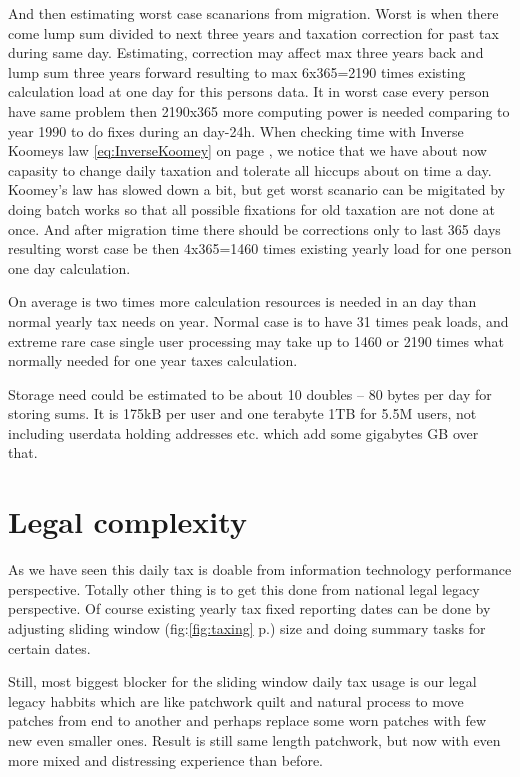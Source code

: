And then estimating worst case scanarions from migration. Worst is when there
come lump sum divided to next three years and taxation correction for past tax
during same day. Estimating, correction may affect max three years back and
lump sum three years forward resulting to max 6x365=2190 times existing
calculation load at one day for this persons data. It in worst case every
person have same problem then 2190x365 more computing power is needed
comparing to year 1990 to do fixes during an day-24h. When checking time with
Inverse Koomeys law \ref{eq:InverseKoomey} on page \pageref{eq:InverseKoomey},
we notice that we have about now capasity to change daily taxation and
tolerate all hiccups about on time a day. Koomey's law has slowed down a bit,
but get worst scanario can be migitated by doing batch works so that all
possible fixations for old taxation are not done at once. And after migration
time there should be corrections only to last 365 days resulting worst case be
then 4x365=1460 times existing yearly load for one person one day calculation.

On average is two times more calculation resources is needed in an day than
normal yearly tax needs on year. Normal case is to have 31 times peak loads,
and extreme rare case single user processing may take up to 1460 or 2190 times
what normally needed for one year taxes calculation.

Storage need could be estimated to be about 10 doubles -- 80 bytes per day for
storing sums. It is 175kB per user and one terabyte 1TB for 5.5M users, not
including userdata holding addresses etc. which add some gigabytes GB over
that.

\section{Legal complexity}
\label{legal_complexity}

As we have seen this daily tax is doable from information technology
performance perspective. Totally other thing is to get this done from national
legal legacy perspective. Of course existing yearly tax fixed reporting
dates can be done by adjusting sliding window (fig:\ref{fig:taxing} 
p.\pageref{fig:taxing}) size and doing summary tasks for certain dates.

Still, most biggest blocker for the sliding window daily tax usage is our
legal legacy habbits which are like patchwork quilt and natural process to
move patches from end to another and perhaps replace some worn patches with
few new even smaller ones. Result is still same length patchwork, but now with
even more mixed and distressing experience than before.

